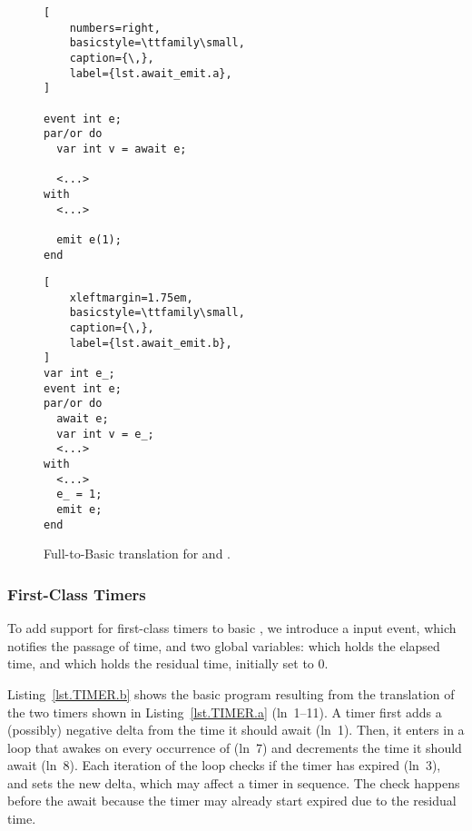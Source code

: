 \begin{figure}[ht!]
\begin{minipage}[t]{0.48\linewidth}
\begin{lstlisting}[
    numbers=right,
    basicstyle=\ttfamily\small,
    caption={\,},
    label={lst.await_emit.a},
]

event int e;
par/or do
  var int v = await e;

  <...>
with
  <...>

  emit e(1);
end
\end{lstlisting}
\end{minipage}
%
\begin{minipage}[t]{0.45\linewidth}
\begin{lstlisting}[
    xleftmargin=1.75em,
    basicstyle=\ttfamily\small,
    caption={\,},
    label={lst.await_emit.b},
]
var int e_;
event int e;
par/or do
  await e;
  var int v = e_;
  <...>
with
  <...>
  e_ = 1;
  emit e;
end
\end{lstlisting}
\end{minipage}
%
\caption{Full-to-Basic translation for  and . }
\label{lst.await_emit}
\end{figure}

\subsubsection{First-Class Timers}

To add support for first-class timers to basic \CEU , we introduce a
 input event, which notifies the passage of time, and two global
variables:  which holds the elapsed time, and 
which holds the residual time, initially set to 0.

Listing~\ref{lst.TIMER.b} shows the basic \CEU program resulting from the
translation of the two timers shown in Listing~\ref{lst.TIMER.a} (ln~1--11).
A timer first adds a (possibly) negative delta from the time it should await
(ln~1).  Then, it enters in a loop that awakes on every occurrence of
 (ln~7) and decrements the time it should await (ln~8).  Each
iteration of the loop checks if the timer has expired (ln~3), and sets the
new delta, which may affect a timer in sequence.  The check happens before
the await because the timer may already start expired due to the residual
time.

